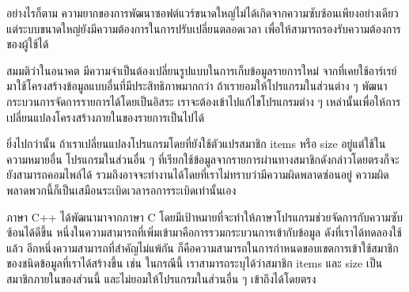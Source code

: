 อย่างไรก็ตาม{\wbr}
ความ{\wbr}ยาก{\wbr}ของ{\wbr}การ{\wbr}พัฒนา{\wbr}ซอฟต์แวร์{\wbr}ขนาด{\wbr}ใหญ่{\wbr}ไม่{\wbr}ได้{\wbr}เกิด{\wbr}จาก{\wbr}ความ{\wbr}ซับซ้อน{\wbr}เพียง{\wbr}อย่างเดียว{\wbr}
แต่{\wbr}ระบบ{\wbr}ขนาด{\wbr}ใหญ่{\wbr}ยัง{\wbr}มี{\wbr}ความ{\wbr}ต้องการ{\wbr}ใน{\wbr}การ{\wbr}ปรับ{\wbr}เปลี่ยน{\wbr}ตลอดเวลา{\wbr}
เพื่อให้{\wbr}สามารถ{\wbr}รองรับ{\wbr}ความ{\wbr}ต้องการ{\wbr}ของ{\wbr}ผู้ใช้{\wbr}ได้{\wbr}

สมมติ{\wbr}ว่า{\wbr}ใน{\wbr}อนาคต มี{\wbr}ความจำ{\wbr}เป็น{\wbr}ต้อง{\wbr}เปลี่ยน{\wbr}รูปแบบ{\wbr}ใน{\wbr}การ{\wbr}เก็บ{\wbr}ข้อมูล{\wbr}รายการ{\wbr}ใหม่{\wbr}
จาก{\wbr}ที่{\wbr}เคย{\wbr}ใช้{\wbr}อาร์เรย์ มา{\wbr}ใช้{\wbr}โครงสร้าง{\wbr}ข้อมูล{\wbr}แบบ{\wbr}อื่น{\wbr}ที่{\wbr}มี{\wbr}ประสิทธิภาพ{\wbr}มาก{\wbr}กว่า{\wbr}
ถ้า{\wbr}เรา{\wbr}ยอม{\wbr}ให้{\wbr}โปรแกรม{\wbr}ใน{\wbr}ส่วน{\wbr}ต่าง ๆ พัฒนา{\wbr}กระบวนการ{\wbr}จัดการ{\wbr}รายการ{\wbr}ได้{\wbr}โดย{\wbr}เป็น{\wbr}อิสระ{\wbr}
เรา{\wbr}จะ{\wbr}ต้อง{\wbr}เข้า{\wbr}ไป{\wbr}แก้ไข{\wbr}โปรแกรม{\wbr}ต่าง ๆ
เหล่านั้น{\wbr}เพื่อให้{\wbr}การ{\wbr}เปลี่ยนแปลง{\wbr}โครงสร้าง{\wbr}ภายใน{\wbr}ของ{\wbr}รายการ{\wbr}เป็น{\wbr}ไป{\wbr}ได้{\wbr}

ยิ่ง{\wbr}ไป{\wbr}กว่า{\wbr}นั้น ถ้า{\wbr}เรา{\wbr}เปลี่ยนแปลง{\wbr}โปรแกรม{\wbr}โดย{\wbr}ที่{\wbr}ยัง{\wbr}ใช้{\wbr}ตัวแปร{\wbr}สมาชิก {\ct items} หรือ {\ct
  size} อยู่{\wbr}แต่{\wbr}ใช้{\wbr}ใน{\wbr}ความหมาย{\wbr}อื่น โปรแกรม{\wbr}ใน{\wbr}ส่วน{\wbr}อื่น ๆ
ที่{\wbr}เรียก{\wbr}ใช้{\wbr}ข้อมูล{\wbr}จาก{\wbr}รายการ{\wbr}ผ่าน{\wbr}ทาง{\wbr}สมาชิก{\wbr}ดังกล่าว{\wbr}โดย{\wbr}ตรง{\wbr}ก็{\wbr}จะ{\wbr}ยัง{\wbr}สามารถ{\wbr}คอมไพล์{\wbr}ได้{\wbr}
รวม{\wbr}ถึง{\wbr}อาจ{\wbr}จะ{\wbr}ทำงาน{\wbr}ได้{\wbr}โดย{\wbr}ที่{\wbr}เรา{\wbr}ไม่{\wbr}ทราบ{\wbr}ว่า{\wbr}มี{\wbr}ความผิด{\wbr}พลาด{\wbr}ซ่อน{\wbr}อยู่{\wbr}
ความผิด{\wbr}พลาด{\wbr}พวก{\wbr}นี้{\wbr}ก็{\wbr}เป็น{\wbr}เสมือน{\wbr}ระเบิดเวลา{\wbr}รอ{\wbr}การ{\wbr}ระเบิด{\wbr}เท่านั้น{\wbr}เอง{\wbr}

ภาษา C++ ได้{\wbr}พัฒนา{\wbr}มา{\wbr}จาก{\wbr}ภาษา C
โดย{\wbr}มี{\wbr}เป้าหมาย{\wbr}ที่{\wbr}จะ{\wbr}ทำ{\wbr}ให้{\wbr}ภาษา{\wbr}โปรแกรม{\wbr}ช่วย{\wbr}จัดการ{\wbr}กับ{\wbr}ความ{\wbr}ซับซ้อน{\wbr}ได้{\wbr}ดี{\wbr}ขึ้น{\wbr}
หนึ่ง{\wbr}ใน{\wbr}ความ{\wbr}สามารถ{\wbr}ที่{\wbr}เพิ่ม{\wbr}เข้า{\wbr}มา{\wbr}คือ{\wbr}การ{\wbr}รวม{\wbr}กระบวนการ{\wbr}เข้า{\wbr}กับ{\wbr}ข้อมูล ดังที่{\wbr}เรา{\wbr}ได้{\wbr}ทดลอง{\wbr}ใช้{\wbr}แล้ว{\wbr}
อีก{\wbr}หนึ่ง{\wbr}ความ{\wbr}สามารถ{\wbr}ที่{\wbr}สำคัญ{\wbr}ไม่{\wbr}แพ้{\wbr}กัน{\wbr}
ก็{\wbr}คือ{\wbr}ความ{\wbr}สามารถ{\wbr}ใน{\wbr}การ{\wbr}กำหนด{\wbr}ขอบเขต{\wbr}การ{\wbr}เข้า{\wbr}ใช้{\wbr}สมาชิก{\wbr}ของ{\wbr}ชนิด{\wbr}ข้อมูล{\wbr}ที่{\wbr}เรา{\wbr}ได้{\wbr}สร้าง{\wbr}ขึ้น เช่น{\wbr}
ใน{\wbr}กรณี{\wbr}นี้ เรา{\wbr}สามารถ{\wbr}ระบุ{\wbr}ได้{\wbr}ว่า{\wbr}สมาชิก {\ct items} และ {\ct size}
เป็น{\wbr}สมาชิก{\wbr}ภายใน{\wbr}ของ{\wbr}ส่วน{\wbr}นี้ และ{\wbr}ไม่{\wbr}ยอม{\wbr}ให้{\wbr}โปรแกรม{\wbr}ใน{\wbr}ส่วน{\wbr}อื่น ๆ เข้าถึง{\wbr}ได้{\wbr}โดย{\wbr}ตรง{\wbr}

